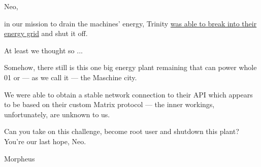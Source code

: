 Neo,

in our mission to drain the machines' energy, Trinity \href{https://nmap.org/movies/matrix/matrix-nmap.mp4}{was able to break into their energy grid} and shut it off.

At least we thought so ...

Somehow, there still is this one big energy plant remaining that can power whole 01 or --- as we call it --- the Maschine city.

We were able to obtain a stable network connection to their API which appears to be based on their custom Matrix protocol --- the inner workings, unfortunately, are unknown to us.

Can you take on this challenge, become root user and shutdown this plant? You're our last hope, Neo.

Morpheus